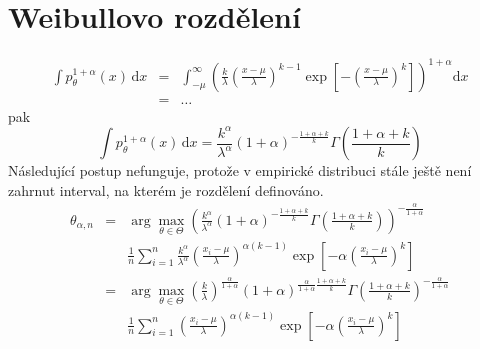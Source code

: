 \documentclass[11pt, a4paper]{article}
\newcommand{\intpa}{\int p_\theta^{1+\alpha}(x) \, \mathrm{d}x }
\newcommand{\amtiT}{\arg \max_{\theta \in \Theta}}
\newcommand{\fa}{\frac{\alpha}{1+\alpha}}
\begin{document}
\section{Weibullovo rozdělení}

\begin{eqnarray}
\intpa & = & \int_{-\mu }^{\infty } \left( \frac{k}{\lambda} \left( \frac{x-\mu}{\lambda} \right)^{k-1} \exp \left[ -\left( \frac{x-\mu}{\lambda} \right)^k \right] \right)^{1+\alpha} \mathrm{d}x \nonumber\\
& = & \ldots \nonumber
\end{eqnarray} 
pak
\begin{equation}
\intpa = \frac{k^\alpha}{\lambda^\alpha}(1+\alpha)^{-\frac{1+\alpha +k}{k}} \Gamma \left( \frac{1+\alpha +k}{k}\right)
\end{equation}
Následující postup nefunguje, protože v empirické distribuci stále ještě není zahrnut interval, na kterém je rozdělení definováno.
\begin{eqnarray}
\theta_{\alpha,n} & = & \amtiT \left(\frac{k^\alpha}{\lambda^\alpha}(1+\alpha)^{-\frac{1+\alpha+k}{k}} \Gamma \left(\frac{1+\alpha+k}{k}\right) \right)^{-\fa} \nonumber \\
&&  \frac{1}{n} \sum_{i=1}^n \frac{k^\alpha}{\lambda^\alpha} \left( \frac{x_i-\mu}{\lambda}\right)^{\alpha(k-1)} \exp \left[-\alpha \left(\frac{x_i-\mu}{\lambda}\right)^k \right] \nonumber \\
& = & \amtiT \left( \frac{k}{\lambda} \right)^\fa (1+\alpha)^{\fa\frac{1+\alpha+k}{k}} \Gamma\left(\frac{1+\alpha+k}{k}\right)^{-\fa} \nonumber\\
&& \frac{1}{n}\sum_{i=1}^n \left( \frac{x_i-\mu}{\lambda}\right)^{\alpha(k-1)} \exp\left[-\alpha \left(\frac{x_i-\mu}{\lambda}\right)^k\right]
\end{eqnarray}
\end{document}
